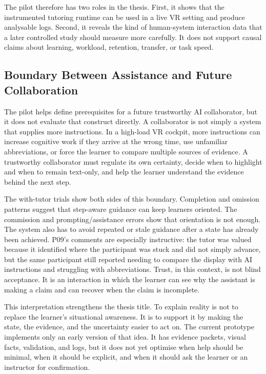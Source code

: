 The pilot therefore has two roles in the thesis. First, it shows that the
instrumented tutoring runtime can be used in a live VR setting and produce
analysable logs. Second, it reveals the kind of human-system interaction data
that a later controlled study should measure more carefully. It does not support
causal claims about learning, workload, retention, transfer, or task speed.

\subsection{Boundary Between Assistance and Future Collaboration}

The pilot helps define prerequisites for a future trustworthy AI collaborator,
but it does not evaluate that construct directly. A collaborator is not simply
a system that supplies more instructions. In a high-load VR cockpit, more
instructions can increase cognitive work if they arrive at the wrong time, use
unfamiliar abbreviations, or force the learner to compare multiple sources of
evidence. A trustworthy collaborator must regulate its own certainty, decide
when to highlight and when to remain text-only, and help the learner understand
the evidence behind the next step.

The with-tutor trials show both sides of this boundary. Completion and omission
patterns suggest that step-aware guidance can keep learners oriented. The
commission and prompting/assistance errors show that orientation is not enough.
The system also has to avoid repeated or stale guidance after a state has
already been achieved. P09's comments are especially instructive: the tutor was
valued because it identified where the participant was stuck and did not simply
advance, but the same participant still reported needing to compare the display
with AI instructions and struggling with abbreviations. Trust, in this context,
is not blind acceptance. It is an interaction in which the learner can see why
the assistant is making a claim and can recover when the claim is incomplete.

This interpretation strengthens the thesis title. To explain reality is not to
replace the learner's situational awareness. It is to support it by making the
state, the evidence, and the uncertainty easier to act on. The current prototype
implements only an early version of that idea. It has evidence packets, visual
facts, validation, and logs, but it does not yet optimise when help should be
minimal, when it should be explicit, and when it should ask the learner or an
instructor for confirmation.


